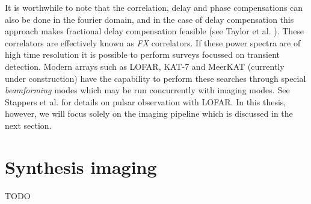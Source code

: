 \documentclass[a4paper,10pt]{report}
\begin{document}
It is worthwhile to note that the correlation, delay and phase compensations can also be done in the fourier domain, and in the case of delay compensation this approach makes fractional delay compensation feasible (see Taylor et al. \cite{taylor1999synthesis}). These correlators are effectively 
known as \textit{FX} correlators. If these power spectra are of high time resolution it is possible to perform surveys focussed on transient detection. Modern arrays such as LOFAR, KAT-7 and MeerKAT (currently under construction) have the capability to perform these searches through
special \textit{beamforming} modes which may be run concurrently with imaging modes. See Stappers et al. \cite{stappers2011observing} for details on pulsar observation with LOFAR. In this thesis, however, we will focus solely on the imaging pipeline which is discussed in the next section.

\section{Synthesis imaging}
{\color{red} TODO}



\end{document}
